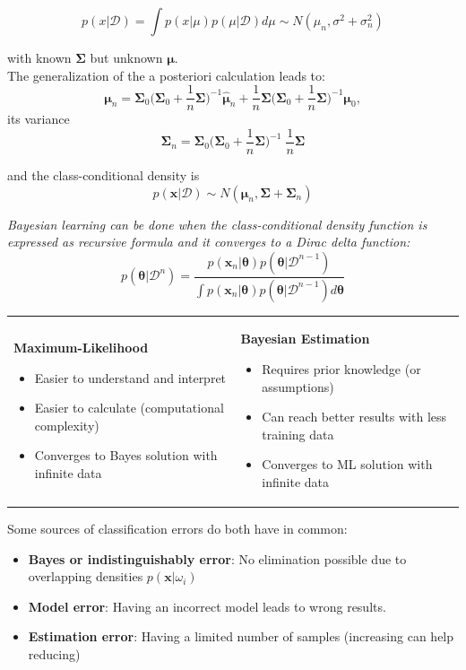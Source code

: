   $$p(x|\mathcal{D}) = \int p(x|\mu) p(\mu|\mathcal{D}) d\mu \sim N(\mu_n, \sigma^2+\sigma_n^2)$$ 
    
  with known $\bm\Sigma$ but unknown $\bm{\mu}$.\\
  The generalization of the a posteriori calculation leads to:
  $$\bm{\mu}_n = \bm{\Sigma}_0 \Big(\bm{\Sigma}_0 + \frac1n \bm{\Sigma}\Big)^{-1}\bm{\hat{\mu}}_n +
    \frac1n \bm{\Sigma} \Big(\bm{\Sigma}_0 + \frac1n \bm{\Sigma}\Big)^{-1} \bm{\mu}_0,$$
  its variance
  $$\bm{\Sigma}_n = \bm{\Sigma}_0 \Big( \bm{\Sigma}_0 + 
    \frac1n \bm{\Sigma}\Big)^{-1}\; \frac1n{\bm{\Sigma}}$$
  
  and the class-conditional density is
  $$p(\bm{x}|\mathcal{D}) \sim N(\bm{\mu}_n, \bm{\Sigma} + \bm{\Sigma}_n)$$
  
  \em Bayesian learning \em can be done when the class-conditional density function is expressed 
  as recursive formula and it converges to a Dirac delta function:
  $$p(\bm{\theta} | \mathcal{D}^n) = \frac{p(\bm{x}_n|\bm{\theta}) p(\bm{\theta}| \mathcal{D}^{n-1})}
  {\int p(\bm{x}_n|\bm{\theta}) p(\bm{\theta}|\mathcal{D}^{n-1}) d\bm{\theta}}$$
  
  
  \begin{tabular}{ll}
    \parbox{9cm}{
      \textbf{Maximum-Likelihood}
      \begin{itemize}
        \item Easier to understand and interpret
        \item Easier to calculate (computational complexity)
        \item Converges to Bayes solution with infinite data
      \end{itemize}
    }
    & \parbox{9cm}{
      \textbf{Bayesian Estimation}
      \begin{itemize}
        \item Requires prior knowledge (or assumptions)
        \item Can reach better results with less training data
        \item Converges to ML solution with infinite data
      \end{itemize}
    }
  \end{tabular}
  
  Some sources of classification errors do both have in common:
  \begin{itemize}
    \item \textbf{Bayes or indistinguishably error}: No elimination possible due to overlapping
    densities $p(\bm{x}|\omega_i)$
  	\item \textbf{Model error}: Having an incorrect model leads to wrong results.
  	\item \textbf{Estimation error}: Having a limited number of samples (increasing can help reducing)
  \end{itemize}
  
